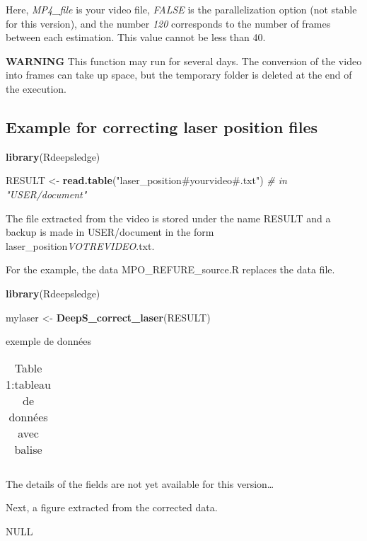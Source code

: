 \documentclass[
]{article}
\newenvironment{Shaded}{\begin{snugshade}}{\end{snugshade}}
\newcommand{\CommentTok}[1]{\textcolor[rgb]{0.56,0.35,0.01}{\textit{#1}}}
\newcommand{\FunctionTok}[1]{\textcolor[rgb]{0.13,0.29,0.53}{\textbf{#1}}}
\newcommand{\NormalTok}[1]{#1}
\newcommand{\OtherTok}[1]{\textcolor[rgb]{0.56,0.35,0.01}{#1}}
\newcommand{\StringTok}[1]{\textcolor[rgb]{0.31,0.60,0.02}{#1}}
\begin{document}
Here, \emph{MP4\_file} is your video file, \emph{FALSE} is the
parallelization option (not stable for this version), and the number
\emph{120} corresponds to the number of frames between each estimation.
This value cannot be less than 40.

\textbf{WARNING} This function may run for several days. The conversion
of the video into frames can take up space, but the temporary folder is
deleted at the end of the execution.

\hypertarget{example-for-correcting-laser-position-files}{%
\subsection{Example for correcting laser position
files}\label{example-for-correcting-laser-position-files}}

\begin{Shaded}
\begin{Highlighting}[]
\FunctionTok{library}\NormalTok{(Rdeepsledge)}

\NormalTok{RESULT }\OtherTok{\textless{}{-}} \FunctionTok{read.table}\NormalTok{(}\StringTok{"laser\_position\#yourvideo\#.txt"}\NormalTok{) }\CommentTok{\# in "USER/document"}
\end{Highlighting}
\end{Shaded}

The file extracted from the video is stored under the name RESULT and a
backup is made in USER/document in the form
laser\_position\emph{VOTREVIDEO}.txt.

For the example, the data MPO\_REFURE\_source.R replaces the data file.

\begin{Shaded}
\begin{Highlighting}[]
\FunctionTok{library}\NormalTok{(Rdeepsledge)}

\NormalTok{mylaser }\OtherTok{\textless{}{-}} \FunctionTok{DeepS\_correct\_laser}\NormalTok{(RESULT)}
\end{Highlighting}
\end{Shaded}

exemple de données

\begin{table}

\caption{\label{tab:cor res}Table 1:tableau de données avec balise}
\centering
\begin{tabu} to \linewidth {}
\hline

\hline
\end{tabu}
\end{table}

The details of the fields are not yet available for this version\ldots{}

Next, a figure extracted from the corrected data.

NULL
\end{document}
